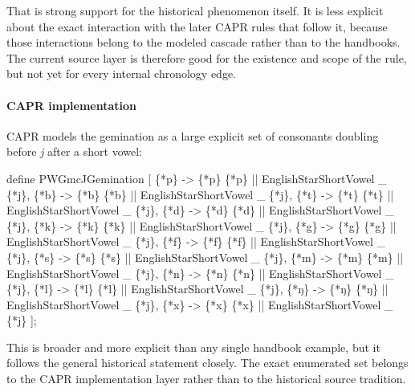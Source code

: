 \documentclass[
  british,
  a4paper,
]{article}
\newenvironment{Shaded}{}{}
\newcommand{\NormalTok}[1]{#1}
\begin{document}
That is strong support for the historical phenomenon itself. It is less
explicit about the exact interaction with the later CAPR rules that
follow it, because those interactions belong to the modeled cascade
rather than to the handbooks. The current source layer is therefore good
for the existence and scope of the rule, but not yet for every internal
chronology edge.

\paragraph{CAPR implementation}\label{capr-implementation-7}

CAPR models the gemination as a large explicit set of consonants
doubling before \emph{j} after a short vowel:

\begin{Shaded}
\begin{Highlighting}[]
\NormalTok{define PWGmcJGemination [}
\NormalTok{    \{*p\} {-}\textgreater{} \{*p\} \{*p\} || EnglishStarShortVowel \_ \{*j\},}
\NormalTok{    \{*b\} {-}\textgreater{} \{*b\} \{*b\} || EnglishStarShortVowel \_ \{*j\},}
\NormalTok{    \{*t\} {-}\textgreater{} \{*t\} \{*t\} || EnglishStarShortVowel \_ \{*j\},}
\NormalTok{    \{*d\} {-}\textgreater{} \{*d\} \{*d\} || EnglishStarShortVowel \_ \{*j\},}
\NormalTok{    \{*k\} {-}\textgreater{} \{*k\} \{*k\} || EnglishStarShortVowel \_ \{*j\},}
\NormalTok{    \{*g\} {-}\textgreater{} \{*g\} \{*g\} || EnglishStarShortVowel \_ \{*j\},}
\NormalTok{    \{*f\} {-}\textgreater{} \{*f\} \{*f\} || EnglishStarShortVowel \_ \{*j\},}
\NormalTok{    \{*s\} {-}\textgreater{} \{*s\} \{*s\} || EnglishStarShortVowel \_ \{*j\},}
\NormalTok{    \{*m\} {-}\textgreater{} \{*m\} \{*m\} || EnglishStarShortVowel \_ \{*j\},}
\NormalTok{    \{*n\} {-}\textgreater{} \{*n\} \{*n\} || EnglishStarShortVowel \_ \{*j\},}
\NormalTok{    \{*l\} {-}\textgreater{} \{*l\} \{*l\} || EnglishStarShortVowel \_ \{*j\},}
\NormalTok{    \{*ŋ\} {-}\textgreater{} \{*ŋ\} \{*ŋ\} || EnglishStarShortVowel \_ \{*j\},}
\NormalTok{    \{*x\} {-}\textgreater{} \{*x\} \{*x\} || EnglishStarShortVowel \_ \{*j\}}
\NormalTok{];}
\end{Highlighting}
\end{Shaded}

This is broader and more explicit than any single handbook example, but
it follows the general historical statement closely. The exact
enumerated set belongs to the CAPR implementation layer rather than to
the historical source tradition.
\end{document}
